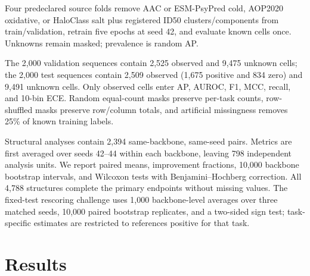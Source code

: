\documentclass[conference]{IEEEtran}
\begin{document}
Four predeclared source folds remove AAC or ESM-PsyPred cold, AOP2020 oxidative, or HaloClass salt plus registered ID50 clusters/components from train/validation, retrain five epochs at seed 42, and evaluate known cells once. Unknowns remain masked; prevalence is random AP.

The 2,000 validation sequences contain 2,525 observed and 9,475 unknown cells; the 2,000 test sequences contain 2,509 observed (1,675 positive and 834 zero) and 9,491 unknown cells. Only observed cells enter AP, AUROC, F1, MCC, recall, and 10-bin ECE. Random equal-count masks preserve per-task counts, row-shuffled masks preserve row/column totals, and artificial missingness removes 25\% of known training labels.

Structural analyses contain 2,394 same-backbone, same-seed pairs. Metrics are first averaged over seeds 42--44 within each backbone, leaving 798 independent analysis units. We report paired means, improvement fractions, 10,000 backbone bootstrap intervals, and Wilcoxon tests with Benjamini--Hochberg correction. All 4,788 structures complete the primary endpoints without missing values. The fixed-test rescoring challenge uses 1,000 backbone-level averages over three matched seeds, 10,000 paired bootstrap replicates, and a two-sided sign test; task-specific estimates are restricted to references positive for that task.

\section{Results}\label{sec:results}
\end{document}
